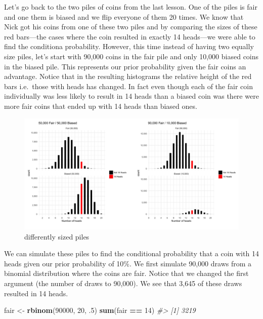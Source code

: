 \documentclass[]{article}
\newenvironment{Shaded}{\begin{snugshade}}{\end{snugshade}}
\newcommand{\CommentTok}[1]{\textcolor[rgb]{0.56,0.35,0.01}{\textit{#1}}}
\newcommand{\DecValTok}[1]{\textcolor[rgb]{0.00,0.00,0.81}{#1}}
\newcommand{\FloatTok}[1]{\textcolor[rgb]{0.00,0.00,0.81}{#1}}
\newcommand{\KeywordTok}[1]{\textcolor[rgb]{0.13,0.29,0.53}{\textbf{#1}}}
\newcommand{\NormalTok}[1]{#1}
\newcommand{\OperatorTok}[1]{\textcolor[rgb]{0.81,0.36,0.00}{\textbf{#1}}}
\newcommand{\StringTok}[1]{\textcolor[rgb]{0.31,0.60,0.02}{#1}}
\begin{document}
Let's go back to the two piles of coins from the last lesson. One of the
piles is fair and one them is biased and we flip everyone of them 20
times. We know that Nick got his coins from one of these two piles and
by comparing the sizes of these red bars---the cases where the coin
resulted in exactly 14 heads---we were able to find the conditiona
probability. However, this time instead of having two equally size
piles, let's start with 90,000 coins in the fair pile and only 10,000
biased coins in the biased pile. This represents our prior probability
given the fair coins an advantage. Notice that in the resulting
histograms the relative height of the red bars i.e.~those with heads has
changed. In fact even though each of the fair coin individually was less
likely to result in 14 heads than a biased coin was there were more fair
coins that ended up with 14 heads than biased ones.

\begin{figure}
\centering
\includegraphics{image-lib/differently_sized_piles.png}
\caption{differently sized piles}
\end{figure}

We can simulate these piles to find the conditional probability that a
coin with 14 heads given our prior probability of 10\%. We first
simulate 90,000 draws from a binomial distribution where the coins are
fair. Notice that we changed the first argument (the number of draws to
90,000). We see that 3,645 of these draws resulted in 14 heads.

\begin{Shaded}
\begin{Highlighting}[]
\NormalTok{fair <-}\StringTok{ }\KeywordTok{rbinom}\NormalTok{(}\DecValTok{90000}\NormalTok{, }\DecValTok{20}\NormalTok{, }\FloatTok{.5}\NormalTok{)}
\KeywordTok{sum}\NormalTok{(fair }\OperatorTok{==}\StringTok{ }\DecValTok{14}\NormalTok{)}
\CommentTok{#> [1] 3219}
\end{Highlighting}
\end{Shaded}
\end{document}
